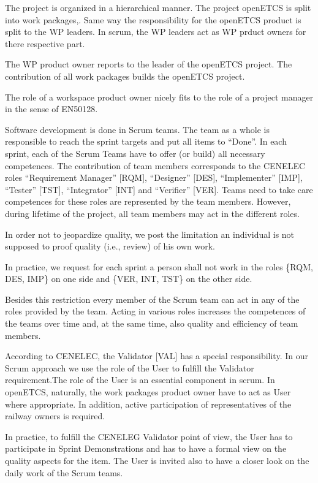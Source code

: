 \documentclass{template/openetcs_article}
\begin{document}
The project is organized in a hierarchical manner. The project openETCS is split into work packages,. Same way the responsibility for the openETCS product is split to the WP leaders. In scrum, the WP leaders act as WP prduct owners for there respective part.

The WP product owner reports to the leader of the openETCS project. The contribution of all work packages builds the openETCS project.

The role of a workspace product owner nicely fits to the role of a project manager in the sense of EN50128.

Software development is done in Scrum teams. The team as a whole is responsible to reach the sprint targets and put all items to ``Done''. In each sprint, each of the Scrum Teams have to offer (or build) all necessary competences. The contribution of team members corresponds to the CENELEC roles ``Requirement Manager'' [RQM], ``Designer'' [DES], ``Implementer'' [IMP], ``Tester'' [TST], ``Integrator'' [INT] and ``Verifier'' [VER]. Teams need to take care competences for these roles are represented by the team members. However, during lifetime of the project, all team members may act in the different roles. 

In order not to jeopardize quality, we post the limitation an individual is not supposed to proof quality (i.e., review) of his own work. 

In practice, we request for each sprint a person shall not work in  the roles \{RQM, DES, IMP\} on one side and \{VER, INT, TST\} on the other side. 

Besides this restriction every member of the Scrum team can act in any of the roles provided by the team. Acting in various roles increases the competences of the teams over time and, at the same time, also quality and efficiency of team members.

According to CENELEC, the Validator [VAL] has a special responsibility. In our Scrum approach we use the role of the User to fulfill the Validator requirement.The role of the User is an essential component in scrum. In openETCS, naturally, the work packages product owner have to  act as User where appropriate.  In addition, active participation of representatives of the railway owners is required.

In practice, to fulfill the CENELEG Validator point of view, the User has to participate in Sprint Demonstrations and has to have a formal view on the quality aspects for the item. The User is invited also to have a closer look on the daily work of the Scrum teams.
\end{document}
